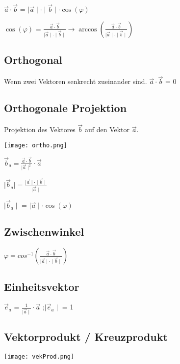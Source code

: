 \begin{multicols*}{3}
{        $ \vec{a} \cdot \vec{b} $ = $ \mid \vec{a} \mid \cdot \mid \vec{b} \mid \cdot \cos(\varphi)$

        $\cos(\varphi) $ = $\frac{\vec{a} \cdot \vec{b}}{\mid \vec{a} \mid \cdot \mid \vec{b} \mid} \rightarrow \arccos(\frac{\vec{a} \cdot \vec{b}}{\mid \vec{a} \mid \cdot \mid \vec{b} \mid}) $
    }
    \WhiteSpace
    \subsection{Orthogonal}
    {Wenn zwei Vektoren senkrecht zueinander sind.}
    $ \vec{a} \cdot \vec{b} $ = 0
    \WhiteSpace
    \subsection{Orthogonale Projektion}
    {Projektion des Vektores $\vec{b} $ auf den Vektor $\vec{a} $.}
    \begin{multicols*}{2}
        {   \texttt{[image: ortho.png]}}

        \columnbreak

        $\vec{b}_a = \frac{\vec{a} \cdot  \vec{b}}{\mid \vec{a} \mid ^2} \cdot \vec{a} $

        $\mid \vec{b}_a  \mid  = \frac{\mid \vec{a} \mid \cdot \mid \vec{b} \mid}{\mid \vec{a} \mid }$

        $ \mid \vec{b}_a \mid $ = $\mid \vec{a} \mid \cdot \cos(\varphi)$

    \end{multicols*}

    \subsection{Zwischenwinkel}
    {$\varphi = cos^{-1}(\frac{\vec{a}\cdot\vec{b}}{\mid \vec{a} \mid \cdot \mid \vec{b} \mid}) $}
    \WhiteSpace
    \subsection{Einheitsvektor}
    {$\vec{e}_a $ = $\frac{1}{\mid \vec{a} \mid} \cdot \vec{a}$ ;$\mid \vec{e}_a \mid$ = 1}
    \subsection{Vektorprodukt / Kreuzprodukt}

    \begin{multicols}{2}
        \noindent
        {\texttt{[image: vekProd.png]}}
        \columnbreak


\end{multicols}
\end{multicols*}
